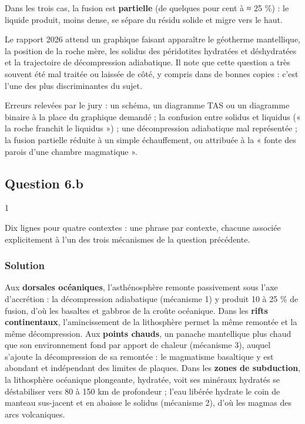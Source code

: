 \documentclass[11pt,a4paper]{article}
\begin{document}
Dans les trois cas, la fusion est \textbf{partielle} (de quelques pour cent à ≈ 25 \%) : le liquide produit, moins dense, se sépare du résidu solide et migre vers le haut.

\begin{jury}

Le rapport 2026 attend un graphique faisant apparaître le géotherme mantellique, la position de la roche mère, les solidus des péridotites hydratées et déshydratées et la trajectoire de décompression adiabatique. Il note que cette question a très souvent été mal traitée ou laissée de côté, y compris dans de bonnes copies : c'est l'une des plus discriminantes du sujet.

\end{jury}

\begin{piege}

Erreurs relevées par le jury : un schéma, un diagramme TAS ou un diagramme binaire à la place du graphique demandé ; la confusion entre solidus et liquidus (« la roche franchit le liquidus ») ; une décompression adiabatique mal représentée ; la fusion partielle réduite à un simple échauffement, ou attribuée à la « fonte des parois d'une chambre magmatique ».

\end{piege}

\hypertarget{question-6.b}{%
\subsection{Question 6.b}\label{question-6.b}}

\begin{indication}{1}

Dix lignes pour quatre contextes : une phrase par contexte, chacune associée explicitement à l'un des trois mécanismes de la question précédente.

\end{indication}

\hypertarget{solution-17}{%
\subsubsection{Solution}\label{solution-17}}

Aux \textbf{dorsales océaniques}, l'asthénosphère remonte passivement sous l'axe d'accrétion : la décompression adiabatique (mécanisme 1) y produit 10 à 25 \% de fusion, d'où les basaltes et gabbros de la croûte océanique. Dans les \textbf{rifts continentaux}, l'amincissement de la lithosphère permet la même remontée et la même décompression. Aux \textbf{points chauds}, un panache mantellique plus chaud que son environnement fond par apport de chaleur (mécanisme 3), auquel s'ajoute la décompression de sa remontée : le magmatisme basaltique y est abondant et indépendant des limites de plaques. Dans les \textbf{zones de subduction}, la lithosphère océanique plongeante, hydratée, voit ses minéraux hydratés se déstabiliser vers 80 à 150 km de profondeur ; l'eau libérée hydrate le coin de manteau sus-jacent et en abaisse le solidus (mécanisme 2), d'où les magmas des arcs volcaniques.
\end{document}
